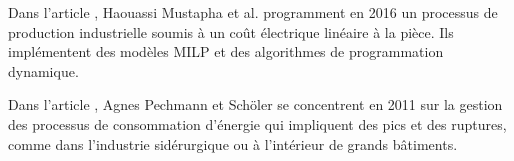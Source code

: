Dans l'article \cite{article_prod3}, Haouassi Mustapha et al. programment en 2016 un processus de production industrielle soumis à un coût électrique linéaire à la pièce. Ils implémentent des modèles MILP et des algorithmes de programmation dynamique.

Dans l'article \cite{article_prod4}, Agnes Pechmann et Schöler se concentrent en 2011 sur la gestion des processus de consommation d'énergie qui impliquent des pics et des ruptures, comme dans l'industrie sidérurgique ou à l'intérieur de grands bâtiments.





%
%
%
%
%
%
%
%
%
%
%
%
%
%
%
%
%
%
%
%
%
%
%
%
%
%
%
%
%








